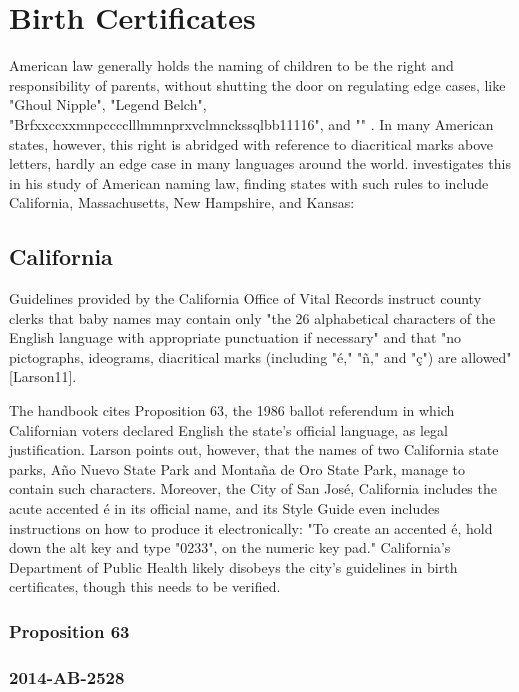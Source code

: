 \section{Birth Certificates}

American law generally holds the naming of children to be the right and
responsibility of parents, without shutting the door on regulating edge cases,
like "Ghoul Nipple", "Legend Belch",
"Brfxxccxxmnpcccclllmmnprxvclmnckssqlbb11116", and "" \parencite{larson11}. In
many American states, however, this right is abridged with reference to
diacritical marks above letters, hardly an edge case in many languages around
the world.  \textcite{larson11} investigates this in his study of American
naming law, finding states with such rules to include California, Massachusetts,
New Hampshire, and Kansas:

\subsection{California}

Guidelines provided by the California Office of Vital Records instruct
county clerks that baby names may contain only "the 26 alphabetical
characters of the English language with appropriate punctuation if
necessary" and that "no pictographs, ideograms, diacritical marks
(including "é," "ñ," and "ç") are allowed" {[}Larson11{]}.

The handbook cites Proposition 63, the 1986 ballot referendum in which
Californian voters declared English the state's official language, as
legal justification. Larson points out, however, that the names of two
California state parks, Año Nuevo State Park and Montaña de Oro State
Park, manage to contain such characters. Moreover, the City of San José,
California includes the acute accented é in its official name, and its
Style Guide even includes instructions on how to produce it
electronically: "To create an accented é, hold down the alt key and
type "0233"‚ on the numeric key pad." California's Department of
Public Health likely disobeys the city's guidelines in birth
certificates, though this needs to be verified.

\subsubsection{Proposition 63}

\subsubsection{2014-AB-2528}

